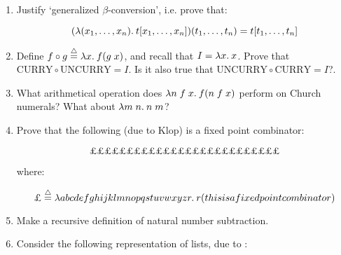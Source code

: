 \begin{enumerate}

\item Justify `generalized $\beta$-conversion', i.e. prove that:

$$(\lambda (x_1,\ldots,x_n).\: t[x_1,\ldots,x_n]) (t_1,\ldots,t_n) =
t[t_1,\ldots,t_n]$$

\item Define $f \circ g \stackrel{\bigtriangleup}{=} \lambda x.\: f(g\; x)$, and recall that $I =
\lambda x.\: x$. Prove that $\mbox{CURRY} \circ \mbox{UNCURRY} = I$. Is it also
true that $\mbox{UNCURRY} \circ \mbox{CURRY} = I$?.

\item What arithmetical operation does $\lambda n\; f\; x.\: f(n\; f\; x)$ perform
on Church numerals? What about $\lambda m\; n.\: n\; m$?

\item Prove that the following (due to Klop) is a fixed point combinator:

$$ \mbox{\pounds}\mbox{\pounds}\mbox{\pounds}\mbox{\pounds}
   \mbox{\pounds}\mbox{\pounds}\mbox{\pounds}\mbox{\pounds}
   \mbox{\pounds}\mbox{\pounds}\mbox{\pounds}\mbox{\pounds}\mbox{\pounds}
   \mbox{\pounds}\mbox{\pounds}\mbox{\pounds}\mbox{\pounds}\mbox{\pounds}
   \mbox{\pounds}\mbox{\pounds}\mbox{\pounds}\mbox{\pounds}\mbox{\pounds}
   \mbox{\pounds}\mbox{\pounds}\mbox{\pounds} $$

\noindent where:

$$ \mbox{\pounds} \defeq \lamb{abcdefghijklmnopqstuvwxyzr}
                         r(thisisafixedpointcombinator) $$

\item Make a recursive definition of natural number subtraction.

\item Consider the following representation of lists, due to
:


\end{enumerate}
